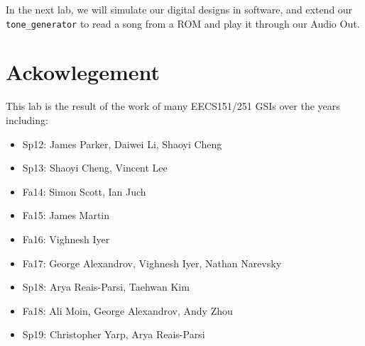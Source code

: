 \documentclass[11pt]{article}
\begin{document}
In the next lab, we will simulate our digital designs in software, and extend our \verb|tone_generator| to read a song from a ROM and play it through our Audio Out.

\section*{Ackowlegement}
This lab is the result of the work of many EECS151/251 GSIs over the years including:
\begin{itemize}
\item Sp12: James Parker, Daiwei Li, Shaoyi Cheng
\item Sp13: Shaoyi Cheng, Vincent Lee
\item Fa14: Simon Scott, Ian Juch
\item Fa15: James Martin
\item Fa16: Vighnesh Iyer
\item Fa17: George Alexandrov, Vighnesh Iyer, Nathan Narevsky
\item Sp18: Arya Reais-Parsi, Taehwan Kim
\item Fa18: Ali Moin, George Alexandrov, Andy Zhou
\item Sp19: Christopher Yarp, Arya Reais-Parsi
\end{itemize}
\end{document}
